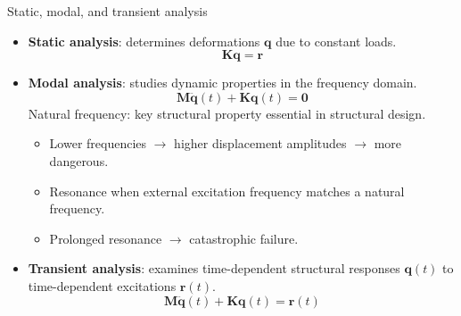 \documentclass[aspectratio=169]{beamer}
\begin{document}
{\begin{frame}{Static, modal, and transient analysis}
  \begin{itemize}
    \item \textbf{Static analysis}: determines deformations $\mathbf q$ due to constant loads.
          $$\mathbf K\mathbf q=\mathbf r$$
    \item  \textbf{Modal analysis}: studies dynamic properties in the frequency domain.
          $$\mathbf M\ddot{\mathbf q}(t)+\mathbf K\mathbf q(t)=\mathbf 0$$
          Natural frequency: key structural property  essential in structural design.
          \begin{itemize}
            \item Lower frequencies $\rightarrow$ higher displacement amplitudes $\rightarrow$ more dangerous.
            \item Resonance when external excitation frequency matches a natural frequency.
            \item Prolonged resonance $\rightarrow$ catastrophic failure.
          \end{itemize}
    \item   \textbf{Transient analysis}: examines time-dependent structural responses $\mathbf q(t)$  to time-dependent excitations $\mathbf r(t)$.
          $$\mathbf M\ddot{\mathbf q}(t)+\mathbf K\mathbf q(t)=\mathbf r(t)$$
  \end{itemize}
\end{frame}

}
\end{document}
